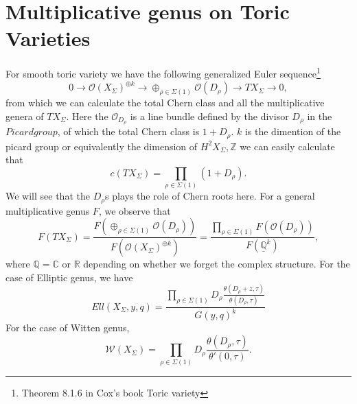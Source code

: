\documentclass[11pt]{article}
\begin{document}
\section{Multiplicative genus on Toric Varieties}
For smooth toric variety we have the following generalized Euler sequence\footnote[2]{Theorem 8.1.6 in Cox's book Toric variety}
\begin{equation*}
0\longrightarrow \mathcal{O}(X_\Sigma)^{\oplus k}\longrightarrow\oplus_{\rho\in \Sigma(1)}\mathcal{O}(D_\rho)\longrightarrow TX_{\Sigma}\longrightarrow0,
\end{equation*}
from which we can calculate the total Chern class and all the multiplicative genera of $TX_{\Sigma}$. Here the $\mathcal{O}_{D_\rho}$ is a line bundle defined by the divisor $D_\rho$ in the $Picard group$, of which the total Chern class is $1+D_\rho$. $k$ is the dimention of the picard group or equivalently the dimension of $H^2{X_\Sigma,\mathbb{Z}}$
we can easily calculate that
\begin{equation*}
	c(TX_{\Sigma})=\prod_{\rho\in \Sigma(1)}(1+D_\rho).
\end{equation*}
We will see that the $D_\rho$s plays the role of Chern roots here.
For a general multiplicative genus $F$, we observe that
\begin{equation*}
F(TX_{\Sigma})=\frac{F(\oplus_{\rho\in \Sigma(1)}\mathcal{O}(D_\rho))}{F(\mathcal{O}(X_\Sigma)^{\oplus k})}=\frac{\prod_{\rho\in \Sigma(1)} F(\mathcal{O}(D_\rho))}{F(\mathbb{\underline{Q}}^k)},
\end{equation*}
where $\mathbb{Q}=\mathbb{C} \text{ or } \mathbb{R}$ depending on whether we forget the complex structure.
For the case of Elliptic genus, we have
\begin{equation*}
Ell(X_\Sigma,y,q)=\frac{\prod_{\rho\in \Sigma(1)}D_\rho\frac{\theta(D_\rho+z,\tau)}{\theta(D_\rho,\tau)}}{G(y,q)^k}
\end{equation*}
For the case of Witten genus,
\begin{equation*}
\mathcal{W}(X_\Sigma)=\prod_{\rho\in \Sigma(1)}D_\rho \frac{\theta(D_\rho,\tau)}{\theta'(0,\tau)}.
\end{equation*}
\end{document}
